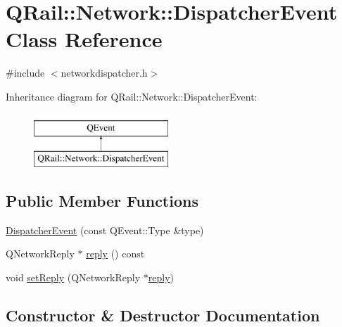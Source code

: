 \hypertarget{classQRail_1_1Network_1_1DispatcherEvent}{}\section{Q\+Rail\+::Network\+::Dispatcher\+Event Class Reference}
\label{classQRail_1_1Network_1_1DispatcherEvent}


{\ttfamily \#include $<$networkdispatcher.\+h$>$}

Inheritance diagram for Q\+Rail\+::Network\+::Dispatcher\+Event\+:\begin{figure}[H]
\begin{center}
\leavevmode
\includegraphics[height=2.000000cm]{classQRail_1_1Network_1_1DispatcherEvent}
\end{center}
\end{figure}
\subsection*{Public Member Functions}
\begin{DoxyCompactItemize}
\item 
\mbox{\hyperlink{classQRail_1_1Network_1_1DispatcherEvent_a4d9e47422ab14e73bd89f184e562d7d2}{Dispatcher\+Event}} (const Q\+Event\+::\+Type \&type)
\item 
Q\+Network\+Reply $\ast$ \mbox{\hyperlink{classQRail_1_1Network_1_1DispatcherEvent_a94a75385c15aca824628940d13124f2f}{reply}} () const
\item 
void \mbox{\hyperlink{classQRail_1_1Network_1_1DispatcherEvent_a68639e6a5ee34d8c8e6bb418d8c006e5}{set\+Reply}} (Q\+Network\+Reply $\ast$\mbox{\hyperlink{classQRail_1_1Network_1_1DispatcherEvent_a94a75385c15aca824628940d13124f2f}{reply}})
\end{DoxyCompactItemize}


\subsection{Constructor \& Destructor Documentation}
\mbox{\label{classQRail_1_1Network_1_1DispatcherEvent_a4d9e47422ab14e73bd89f184e562d7d2}} 
